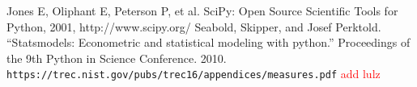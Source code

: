 \documentclass[letterpaper, 10 pt, conference]{ieeeconf}  %
\newcommand\todo[1]{\textcolor{red}{#1}}
\begin{document}
\addtolength{\textheight}{-12cm}   %







\begin{thebibliography}{99}
 Jones E, Oliphant E, Peterson P, et al. SciPy: Open Source Scientific Tools for Python, 2001, http://www.scipy.org/ 
 Seabold, Skipper, and Josef Perktold. “Statsmodels: Econometric and statistical modeling with python.” Proceedings of the 9th Python in Science Conference. 2010.
 \texttt{https://trec.nist.gov/pubs/trec16/appendices/measures.pdf}
\todo{add lulz}
\end{thebibliography}
\end{document}
